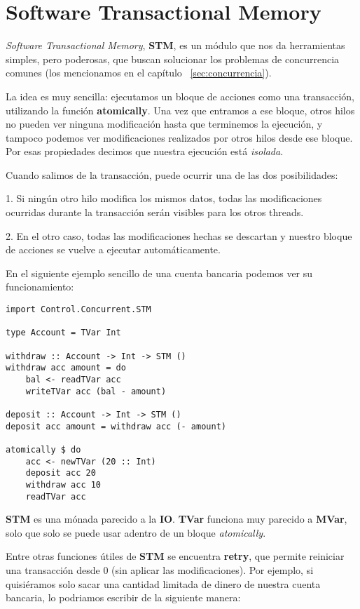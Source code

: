 
\section{Software Transactional Memory} %
\label{sec:software_transactional_memory}

\textit{Software Transactional Memory}, \textbf{STM}, es un módulo que nos da herramientas simples, pero poderosas, que buscan solucionar los problemas de concurrencia comunes (los mencionamos en el capítulo ~\ref{sec:concurrencia}).

La idea es muy sencilla: ejecutamos un bloque de acciones como una transacción, utilizando la función \textbf{atomically}. Una vez que entramos a ese bloque, otros hilos no pueden ver ninguna modificación hasta que terminemos la ejecución, y tampoco podemos ver modificaciones realizados por otros hilos desde ese bloque. Por esas propiedades decimos que nuestra ejecución está \textit{isolada}.

Cuando salimos de la transacción, puede ocurrir una de las dos posibilidades:

1. Si ningún otro hilo modifica los mismos datos, todas las modificaciones ocurridas durante la transacción serán visibles para los otros threads.

2. En el otro caso, todas las modificaciones hechas se descartan y nuestro bloque de acciones se vuelve a ejecutar automáticamente.

En el siguiente ejemplo sencillo de una cuenta bancaria podemos ver su funcionamiento:

\begin{lstlisting}
import Control.Concurrent.STM

type Account = TVar Int

withdraw :: Account -> Int -> STM ()
withdraw acc amount = do
    bal <- readTVar acc
    writeTVar acc (bal - amount)

deposit :: Account -> Int -> STM ()
deposit acc amount = withdraw acc (- amount)

atomically $ do
    acc <- newTVar (20 :: Int)
    deposit acc 20
    withdraw acc 10
    readTVar acc
\end{lstlisting}


\textbf{STM} es una mónada parecido a la \textbf{IO}. \textbf{TVar} funciona muy parecido a \textbf{MVar}, solo que solo se puede usar adentro de un bloque \textit{atomically}.

Entre otras funciones útiles de \textbf{STM} se encuentra \textbf{retry}, que permite reiniciar una transacción desde 0 (sin aplicar las modificaciones). Por ejemplo, si quisiéramos solo sacar una cantidad limitada de dinero de nuestra cuenta bancaria, lo podriamos escribir de la siguiente manera:

